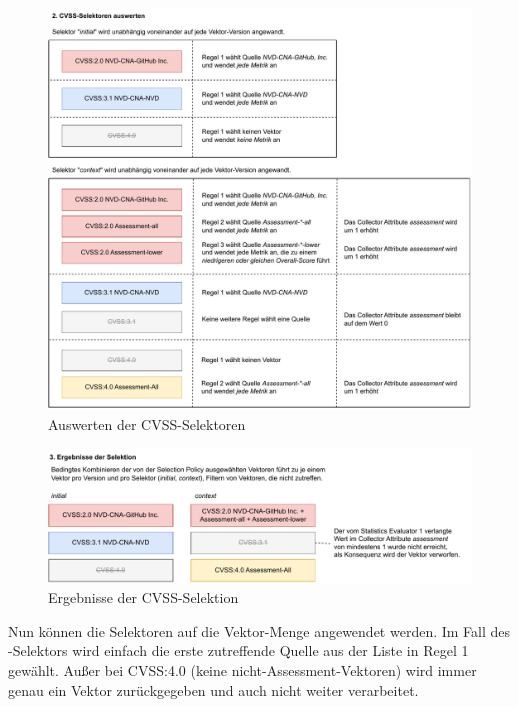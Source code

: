 \begin{figure}[htbp] %
    \centering
    \includegraphics[width=1\textwidth, keepaspectratio]{res/grafiken/cvss-selection-process-selection-2}
    \caption{Auswerten der CVSS-Selektoren}
    \label{fig:cvss-selection-process-selection-2}
\end{figure}

\begin{figure}[htbp] %
    \centering
    \includegraphics[width=1\textwidth, keepaspectratio]{res/grafiken/cvss-selection-process-selection-3}
    \caption{Ergebnisse der CVSS-Selektion}
    \label{fig:cvss-selection-process-selection-3}
\end{figure}

Nun können die Selektoren auf die Vektor-Menge angewendet werden.
Im Fall des -Selektors wird einfach die erste zutreffende Quelle aus der Liste in Regel 1 gewählt.
Außer bei CVSS:4.0 (keine nicht-Assessment-Vektoren) wird immer genau ein Vektor zurückgegeben und auch nicht weiter verarbeitet.

